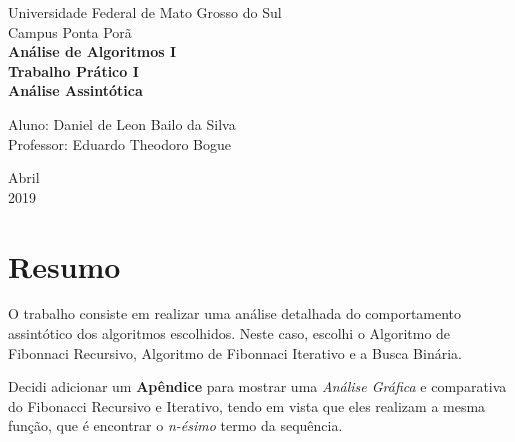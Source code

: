 \documentclass[a4paper, 12pt]{article}
\begin{document}
\begin{titlepage}
    \begin{center}
		\LARGE{Universidade Federal de Mato Grosso do Sul}\\
		\vspace{15pt}
        \large{Campus Ponta Porã}\\ 
        \large{{\textbf{Análise de Algoritmos I}}}\\ 
        \vspace{15pt}
        \vspace{95pt}
        \textbf{\large{Trabalho Prático I}}\\
        \vspace{15pt}
        \textbf{\LARGE{Análise Assintótica}}\\
        \vspace{3,5cm}
    \end{center}
    
    \begin{flushleft}
        \begin{tabbing}
            Aluno: Daniel de Leon Bailo da Silva\\
            Professor: Eduardo Theodoro Bogue\\
    \end{tabbing}
 \end{flushleft}
    \vspace{1cm}
    
    \begin{center}
        \vspace{\fill}
             Abril\\
         2019
            \end{center}
\end{titlepage}

\newpage
\tableofcontents
\thispagestyle{empty}

\newpage
{}
\section{Resumo}
O trabalho consiste em realizar uma análise detalhada do comportamento assintótico dos algoritmos escolhidos. Neste caso, escolhi o Algoritmo de Fibonnaci Recursivo, Algoritmo de Fibonnaci Iterativo e a Busca Binária. 

Decidi adicionar um {\bf Apêndice} para mostrar uma {\it Análise Gráfica} e comparativa do Fibonacci Recursivo e Iterativo, tendo em vista que eles realizam a mesma função, que é encontrar o {\it n-ésimo} termo da sequência.
\end{document}
